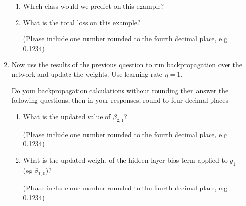 \begin{enumerate}
\begin{enumerate}
        \item Which class would we predict on this example?
        
        \begin{tcolorbox}[fit,height=1cm,blank, borderline={1pt}{-2pt},nobeforeafter]
        \end{tcolorbox}
        
        \item What is the total loss on this example?
        
        (Please include one number rounded to the fourth decimal place, e.g. 0.1234)
        
        \begin{tcolorbox}[fit,height=1cm,blank, borderline={1pt}{-2pt},nobeforeafter]
        \end{tcolorbox}
        
    
    \end{enumerate}
    \clearpage
    \item {} Now use the results of the previous question to run backpropagation over the network and update the weights. Use learning rate $\eta=1$. 
    
     Do your backpropagation calculations without rounding then answer the following questions, then in your responses, round to four decimal places
    
     \begin{enumerate}
        \item What is the updated value of ${\beta}_{2,1}$?
        
        (Please include one number rounded to the fourth decimal place, e.g. 0.1234)
        
        \begin{tcolorbox}[fit,height=1cm,blank, borderline={1pt}{-2pt},nobeforeafter]
        \end{tcolorbox}
        
        \item What is the updated weight of the hidden layer bias term applied to $y_1$ (eg ${\beta}_{1,0}$)?
        
        (Please include one number rounded to the fourth decimal place, e.g. 0.1234)
        

\end{enumerate}
\end{enumerate}
